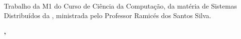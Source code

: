 %
%

\makeatletter
\begin{folhaderosto}
	\thispagestyle{empty}%
	
    \begin{center}
    
		\small\textbf{\expandafter\uppercase\expandafter{\imprimirnomeautor}}\\
		\vspace*{6.2 cm}%
		\normalsize\textbf{\expandafter\uppercase\expandafter{\imprimirtitulotb}}\\
		
    \end{center}
	
	\vspace*{2.35 cm}%
		    \large%
    		\hfill%
	    	\begin{minipage}{8 cm}%
	    		\begin{small} %
	    		\setlength{\baselineskip}{0.7\baselineskip}
				
		    {Trabalho da M1 do Curso de Ciência da Computação,
		    da matéria de Sistemas Distribuídos da {\imprimirinstituicao},
		    ministrada pelo Professor Ramicés dos Santos Silva.
		    	}
				
				
				\end{small} %
		    \end{minipage}%
		    	
		    \vspace*{6 cm}%
		    
		    \begin{center} %
		    	\normalsize %
	    		\textbf{\imprimirlocalapresentacao, \imprimirdataapresentacao}
	    	\end{center}%

\end{folhaderosto}
\makeatother
